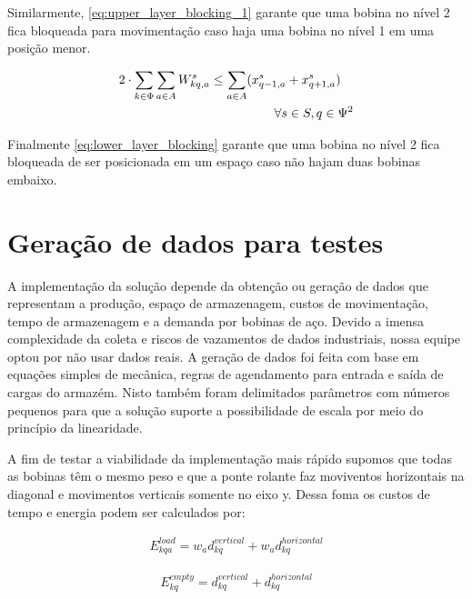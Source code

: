 \documentclass[journal]{IEEEtran}
\begin{document}
        Similarmente, \ref{eq:upper_layer_blocking_1} garante que uma bobina no nível 2 fica 
        bloqueada para movimentação caso haja uma bobina no nível 1 em uma posição
        menor.

        \begin{align}
            2 \cdot \sum_{k \in \Phi} \sum_{a \in A} W^s_{kq,a} \leq \sum_{a \in A} (x^s_{q-1,a} + x^s_{q+1,a}) \quad \notag \\
            \forall s \in S, q \in \Psi^2
            \label{eq:lower_layer_blocking}
        \end{align}

        Finalmente \ref{eq:lower_layer_blocking} garante que uma bobina no nível 2 fica 
        bloqueada de ser posicionada em um espaço caso não hajam duas bobinas 
        embaixo.

    \section{Geração de dados para testes}

        A implementação da solução depende da obtenção ou geração de dados que
        representam a produção, espaço de armazenagem, custos de movimentação, 
        tempo de armazenagem e a demanda por bobinas de aço.
        Devido a imensa complexidade da coleta e riscos de vazamentos de dados 
        industriais, nossa equipe optou por não usar dados reais.
        A geração de dados foi feita com base em equações simples de mecânica,
        regras de agendamento para entrada e saída de cargas do armazém. Nisto também
        foram delimitados parâmetros com números pequenos para que a solução suporte
        a possibilidade de escala por meio do princípio da linearidade.
        
        A fim de testar a viabilidade da implementação mais rápido supomos que 
        todas as bobinas têm o mesmo peso e que a ponte rolante faz moviventos 
        horizontais na diagonal e movimentos verticais somente no eixo y. Dessa
        foma os custos de tempo e energia podem ser calculados por:

        \begin{align}
            E^{load}_{kqa} = w_a d^{vertical}_{kq} + w_a d^{horizontal}_{kq}
        \end{align}

        \begin{align}
            E^{empty}_{kq} = d^{vertical}_{kq} + d^{horizontal}_{kq}
        \end{align}
\end{document}
